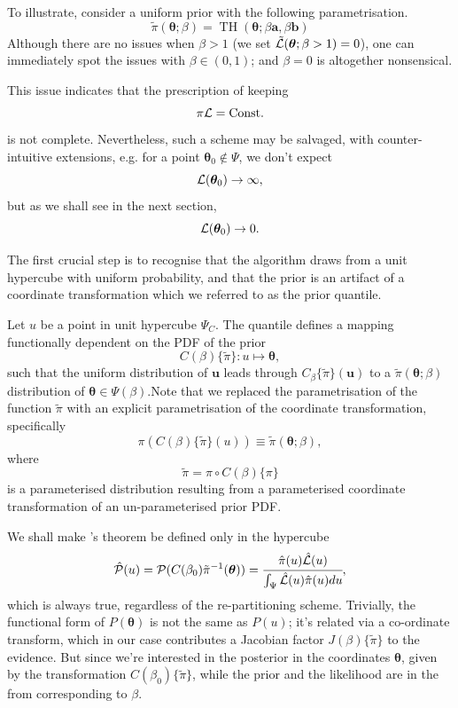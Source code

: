 \documentclass[usenatbib]{mnras}
\DeclareMathOperator{\TopHat}{TH}
\begin{document}
To illustrate, consider a uniform prior with the following
parametrisation.
\begin{equation*}
  \tilde{\pi}(\bm{\theta}; \beta) = \TopHat(\bm{\theta}; \beta \bm{a}, \beta \bm{b})
\end{equation*}
Although there are no issues when \(\beta>1\) (we set
\({\cal\tilde{L}}(\bm{\theta}; \beta>1)=0\)), one can immediately
spot the issues with \(\beta \in (0,1)\); and \(\beta=0\) is
altogether nonsensical.

This issue indicates that the prescription of keeping \[\pi {\cal
	L} = \text{Const.}\] is not complete. Nevertheless, such a scheme
may be salvaged, with counter-intuitive extensions, e.g. for a
point \(\bm{\theta}_{0} \notin \Psi\), we don't expect
\[{\cal L}(\bm{\theta}_{0}) \rightarrow \infty,\] but as we shall see in
the next section, \[{\cal L}(\bm{\theta}_{0}) \rightarrow 0.\]

The first crucial step is to recognise that the algorithm draws
from a unit hypercube with uniform probability, and that the prior
is an artifact of a coordinate transformation which we referred to
as the prior quantile.

Let \(u\) be a point in unit hypercube \(\Psi_{C}\). The quantile
defines a mapping functionally dependent on the PDF of the prior
\[C(\beta)\lbrace \tilde{\pi}\rbrace:u \mapsto \bm{\theta},\] such that
the uniform distribution of \(\bm{u}\) leads through
\(C_{\beta}\{\tilde{\pi}\}(\bm{u})\) to a \(\tilde{\pi}(\bm{\theta};\beta)\)
distribution of \(\bm{\theta} \in\Psi(\beta)\).Note that we replaced the
parametrisation of the function \(\tilde{\pi}\) with an explicit
parametrisation of the coordinate transformation, specifically
\begin{equation*}
  \pi(C(\beta)\{\tilde{\pi}\}(u)) \equiv \tilde{\pi}(\bm{\theta}; \beta),
\end{equation*}
where 
\begin{equation*}
  \tilde{\pi} =  \pi \circ C(\beta) \{ \pi \} 
\end{equation*}
is a parameterised distribution resulting from a parameterised
coordinate transformation of an un-parameterised prior PDF.

We shall make \citeauthor{1763} 's theorem be defined only in the
hypercube
\begin{equation*}
{\cal \hat{P}}(u) = {\cal P}(C(\beta_{0}){\tilde{\pi}}^{-1}(\bm{\theta})) = \cfrac{\hat{\pi} (u) {\cal \hat{L}}(u)}{\int_{\Psi}{\cal \hat{L}}(u) \hat{\pi}(u) du},
\end{equation*}
which is always true, regardless of the re-partitioning
scheme. Trivially, the functional form of \(P(\bm{\theta})\) is not the same
as \(P(u)\); it's related via a co-ordinate transform, which in our
case contributes a Jacobian factor \(J(\beta)\{\tilde{\pi}\}\) to the
evidence. But since we're interested in the posterior in the
coordinates \(\bm{\theta}\), given by the transformation \(C(\beta_{0})\{\tilde{\pi}\}\),
while the prior and the likelihood are in the from corresponding
to \(\beta\).
\end{document}
